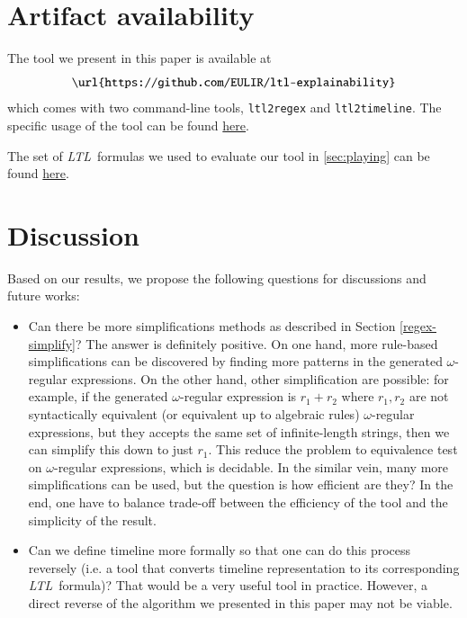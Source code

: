 \documentclass[preprint,12pt]{elsarticle}
\theoremstyle{definition}
\theoremstyle{remark}
\newcommand{\ltl}{\textit{LTL}}
\newcommand{\tool}{\hspace{0.1cm}\texttt{ltl2timeline}\hspace{0.1cm}}
\begin{document}




\section{Artifact availability}
The tool we present in this paper is available at
\[
    \texttt{\url{https://github.com/EULIR/ltl-explainability}}
\]
which comes with two command-line tools, \texttt{ltl2regex} and \tool. The specific usage of the tool can be found  \href{https://github.com/EULIR/ltl-explainability#usage}{here}.

The set of \ltl\ formulas we used to evaluate our tool in \cref{sec:playing} can be found \href{https://github.com/EULIR/ltl-explainability/tree/main/ltl-formulas}{here}.

\section{Discussion}
Based on our results, we propose the following questions for discussions and future works:
\begin{itemize}
    \item Can there be more simplifications methods as described in Section \ref{regex-simplify}? The answer is definitely positive. On one hand, more rule-based simplifications can be discovered by finding more patterns in the generated $\omega$-regular expressions. On the other hand, other simplification are possible: for example, if the generated $\omega$-regular expression is $r_1 + r_2$ where $r_1, r_2$ are not syntactically equivalent (or equivalent up to algebraic rules) $\omega$-regular expressions, but they accepts the same set of infinite-length strings, then we can simplify this down to just $r_1$. This reduce the problem to equivalence test on $\omega$-regular expressions, which is decidable. In the similar vein, many more simplifications can be used, but the question is how efficient are they? In the end, one have to balance trade-off between the efficiency of the tool and the simplicity of the result.
    \item Can we define timeline more formally so that one can do this process reversely (i.e. a tool that converts timeline representation to its corresponding \ltl\ formula)? That would be a very useful tool in practice. However, a direct reverse of the algorithm we presented in this paper may not be viable.
\end{itemize}
\end{document}
